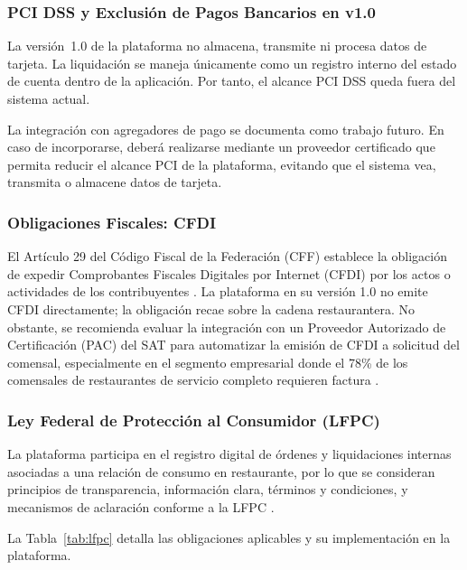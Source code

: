 \subsubsection{PCI DSS y Exclusión de Pagos Bancarios en v1.0}

La versi\'on~1.0 de la plataforma no almacena, transmite ni procesa datos de tarjeta.
La liquidaci\'on se maneja únicamente como un registro interno del estado de cuenta dentro de la
aplicación. Por tanto, el alcance PCI DSS queda fuera del sistema actual.

La integraci\'on con agregadores de pago se documenta como trabajo futuro. En caso de
incorporarse, deberá realizarse mediante un proveedor certificado que permita reducir el
alcance PCI de la plataforma, evitando que el sistema vea, transmita o almacene datos de
tarjeta.

\subsubsection{Obligaciones Fiscales: CFDI}

El Artículo 29 del Código Fiscal de la Federación (CFF) establece la obligación
de expedir Comprobantes Fiscales Digitales por Internet (CFDI) por los actos o
actividades de los contribuyentes \cite{cff_art29}. La plataforma en su versión 1.0 no emite
CFDI directamente; la obligación recae sobre la cadena restaurantera. No obstante,
se recomienda evaluar la integración con un Proveedor Autorizado de Certificación
(PAC) del SAT \cite{sat_pac} para automatizar la emisión de CFDI a solicitud del comensal,
especialmente en el segmento empresarial donde el 78\% de los comensales
de restaurantes de servicio completo requieren factura \cite{inegi_canirac_2023}.

\subsubsection{Ley Federal de Protección al Consumidor (LFPC)}

La plataforma participa en el registro digital de órdenes y liquidaciones internas
asociadas a una relación de consumo en restaurante, por lo que se consideran
principios de transparencia, información clara, términos y condiciones, y mecanismos
de aclaración conforme a la LFPC \cite{lfpc}.

La Tabla~\ref{tab:lfpc} detalla las obligaciones aplicables y su implementación
en la plataforma.

